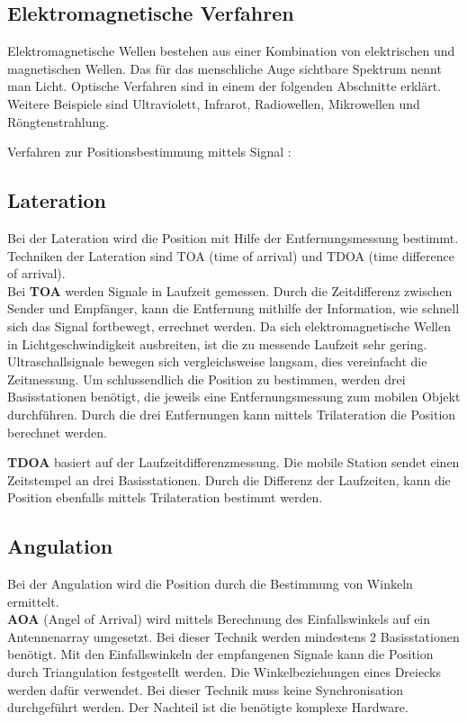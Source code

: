     \subsection{Elektromagnetische Verfahren}
    Elektromagnetische Wellen bestehen aus einer Kombination von elektrischen und magnetischen Wellen. Das für das menschliche Auge sichtbare Spektrum nennt man Licht. Optische Verfahren sind in einem der folgenden Abschnitte erklärt. Weitere Beispiele sind Ultraviolett, Infrarot, Radiowellen, Mikrowellen und Röngtenstrahlung.

    Verfahren zur Positionsbestimmung mittels Signal\cite{pos_signal_2} \cite{pos_signal_4}:

    \subsection*{Lateration}
    Bei der Lateration wird die Position mit Hilfe der Entfernungsmessung bestimmt.
    Techniken der Lateration sind TOA (time of arrival) und TDOA (time difference of arrival).\\
    Bei \textbf{TOA} werden Signale in Laufzeit gemessen. Durch die Zeitdifferenz zwischen Sender und Empfänger, kann die Entfernung mithilfe der Information, wie schnell sich das Signal fortbewegt, errechnet werden. Da sich elektromagnetische Wellen in Lichtgeschwindigkeit ausbreiten, ist die zu messende Laufzeit sehr gering. Ultraschallsignale bewegen sich vergleichsweise langsam, dies vereinfacht die Zeitmessung.
    Um schlussendlich die Position zu bestimmen, werden drei Basisstationen benötigt, die jeweils eine Entfernungsmessung zum mobilen Objekt durchführen. Durch die drei Entfernungen kann mittels Trilateration die Position berechnet werden.

    \textbf{TDOA} basiert auf der Laufzeitdifferenzmessung.
    Die mobile Station sendet einen Zeitstempel an drei Basisstationen. Durch die Differenz der Laufzeiten, kann die Position ebenfalls mittels Trilateration bestimmt werden.

    \subsection*{Angulation}
    Bei der Angulation wird die Position durch die Bestimmung von Winkeln ermittelt. \\
    \textbf{AOA} (Angel of Arrival) wird mittels Berechnung des Einfallswinkels auf ein Antennenarray umgesetzt. Bei dieser Technik werden mindestens 2 Basisstationen benötigt. Mit den Einfallswinkeln der empfangenen Signale kann die Position durch Triangulation festgestellt werden. Die Winkelbeziehungen eines Dreiecks werden dafür verwendet.
    Bei dieser Technik muss keine Synchronisation durchgeführt werden. Der Nachteil ist die benötigte komplexe Hardware.

